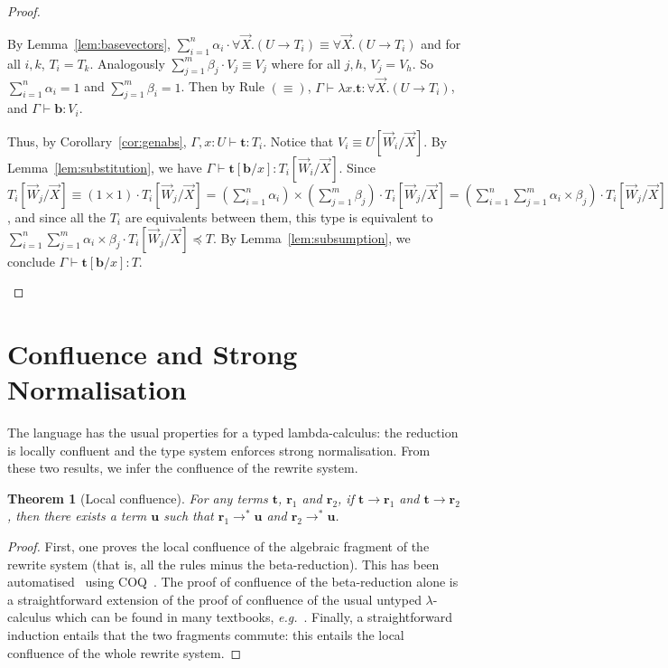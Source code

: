 \documentclass[colorlinks=true,linkcolor=black,urlcolor=black,citecolor=blue,submission,copyright,creativecommons]{eptcs}
\newtheorem{theorem}{Theorem}[section]
\newcommand{\eg}{\emph{e.g.}~}
\newcommand{\ve}[1]{\mathrm{\textbf{#1}}}
\newcommand{\type}{\colon\!}
\newcommand{\sui}[1]{\sum_{i=1}^{#1}}
\newcommand{\suj}[1]{\sum_{j=1}^{#1}}
\begin{document}
\begin{proof}
\begin{description}
      By Lemma~\ref{lem:basevectors}, $\sui{n}\alpha_i\cdot
      \forall\vec{X}.(U\to T_i)\equiv \forall\vec{X}.(U\to T_i)$ and
      for all $i,k$, $T_i=T_k$. Analogously $\suj{m} \beta_j\cdot
      V_j\equiv V_j$ where for all $j,h$, $V_j=V_h$. So $\sui{n}\alpha_i=1$ and $\suj{m}\beta_i=1$. Then by Rule $(\equiv)$, $\Gamma\vdash\lambda x.\ve{t}\type \forall\vec{X}.(U\to T_i)$,  and $\Gamma\vdash\ve{b}\type V_i$.

      Thus, by Corollary~\ref{cor:genabs}, $\Gamma,x\type
      U\vdash\ve{t}\type T_i$. Notice that $V_i\equiv
      U[\vec{W}_i/\vec{X}]$. By Lemma~\ref{lem:substitution}, we have
      $\Gamma\vdash\ve{t}[\ve{b}/x]\type
      T_i[\vec{W}_i/\vec{X}]$. Since $T_i[\vec{W}_j/\vec{X}]\equiv
      (1\times 1)\cdot T_i[\vec{W}_j/\vec{X}]=
      (\sui{n}\alpha_i)\times(\suj{m}\beta_j)\cdot
      T_i[\vec{W}_j/\vec{X}]=(\sui{n}\suj{m}\alpha_i\times\beta_j)\cdot
      T_i[\vec{W}_j/\vec{X}]$, and since all the $T_i$ are equivalents
      between them, this type is equivalent to
      $\sui{n}\suj{m}\alpha_i\times\beta_j\cdot
      T_i[\vec{W}_j/\vec{X}]\preceq T$. By
      Lemma~\ref{lem:subsumption}, we conclude $\Gamma\vdash\ve{t}[\ve{b}/x]\type T$.\qedhere
\end{description}
\end{proof}


\section{Confluence and Strong Normalisation}\label{sec:conf}
 The language has the usual properties for a typed lambda-calculus: the reduction is locally confluent and the type system enforces strong normalisation. From these two results, we infer the confluence of the rewrite system.
 
\begin{theorem}[Local confluence]\label{thm:localconf}
   For any terms $\ve t$, $\ve r_1$ and $\ve r_2$, if $\ve t\to\ve r_1$ and $\ve t\to\ve r_2$, then there exists a term $\ve u$ such that $\ve r_1\to^*\ve u$ and $\ve r_2\to^*\ve u$. 
\end{theorem}
\begin{proof}
   First, one proves the local confluence of the algebraic fragment of the rewrite system (that is, all the rules minus the beta-reduction). This has been automatised~\cite{BenCoqProof} using COQ~\cite{ManualCOQ}.
The proof of confluence of the beta-reduction alone is a
   straightforward extension of the proof of confluence of the usual
   untyped $\lambda$-calculus which can be found in many textbooks,
   \eg \cite[Sec. 1.3]{Krivine90}.
Finally, a straightforward induction entails that the two fragments commute: this entails the local confluence of the whole rewrite system.
\end{proof}
\end{document}
